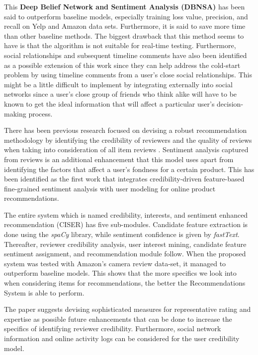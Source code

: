 \documentclass[manuscript,screen,review]{acmart}
\begin{document}
This \textbf{Deep Belief Network and Sentiment Analysis (DBNSA)} has been said to outperform baseline models, especially training loss value, precision, and recall on Yelp and Amazon data sets. Furthermore, it is said to save more time than other baseline methods. The biggest drawback that this method seems to have is that the algorithm is not suitable for real-time testing.
Furthermore, social relationships and subsequent timeline comments have also been identified as a possible extension of this work since they can help address the cold-start problem by using timeline comments from a user's close social relationships. This might be a little difficult to implement by integrating externally into social networks since a user's close group of friends who think alike will have to be known to get the ideal information that will affect a particular user's decision-making process.

\bigbreak

There has been previous research focused on devising a robust recommendation methodology by identifying the credibility of reviewers and the quality of reviews when taking into consideration of all item reviews \cite{hu_reviewer_2020}. Sentiment analysis captured from reviews is an additional enhancement that this model uses apart from identifying the factors that affect a user's fondness for a certain product. This has been identified as the first work that integrates credibility-driven feature-based fine-grained sentiment analysis with user modeling for online product recommendations.

The entire system which is named credibility, interests, and sentiment enhanced recommendation (CISER) has five sub-modules. Candidate feature extraction is done using the \emph{spaCy} library, while sentiment confidence is given by \emph{fastText}. Thereafter, reviewer credibility analysis, user interest mining, candidate feature sentiment assignment, and recommendation module follow.
When the proposed system was tested with Amazon's camera review data-set, it managed to outperform baseline models. This shows that the more specifics we look into when considering items for recommendations, the better the Recommendations System is able to perform. 

The paper suggests devising sophisticated measures for representative rating and expertise as possible future enhancements that can be done to increase the specifics of identifying reviewer credibility. Furthermore, social network information and online activity logs can be considered for the user credibility model.
\end{document}
